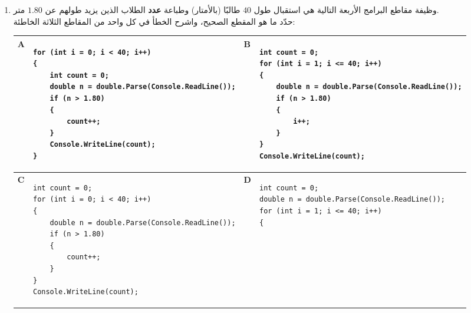 \documentclass[14pt]{extarticle}
\begin{document}
\begin{enumerate}[resume, itemsep=1em]

\item وظيفة مقاطع البرامج الأربعة التالية هي استقبال طول $40$ طالبًا (بالأمتار) وطباعة \textbf{عدد} الطلاب الذين يزيد طولهم عن $1.80$ متر. \\
حدّد ما هو المقطع الصحيح، واشرح الخطأ في كل واحد من المقاطع الثلاثة الخاطئة:

{\centering
\renewcommand{\arraystretch}{1.3}
\begin{tabular}{|C{0.8cm}|p{6.6cm}|C{0.8cm}|p{6.6cm}|}
\hline
$\mathbf{A}$ &
\begin{pycell}
\begin{english}
\begin{verbatim}
for (int i = 0; i < 40; i++)
{
    int count = 0;
    double n = double.Parse(Console.ReadLine());
    if (n > 1.80)
    {
        count++;
    }
    Console.WriteLine(count);
}
\end{verbatim}
\end{english}
\end{pycell}
& $\mathbf{B}$ &
\begin{pycell}
\begin{english}
\begin{verbatim}
int count = 0;
for (int i = 1; i <= 40; i++)
{
    double n = double.Parse(Console.ReadLine());
    if (n > 1.80)
    {
        i++;
    }
}
Console.WriteLine(count);
\end{verbatim}
\end{english}
\end{pycell}
\\ \hline
$\mathbf{C}$ &
\begin{pycell}
\begin{english}
\begin{verbatim}
int count = 0;
for (int i = 0; i < 40; i++)
{
    double n = double.Parse(Console.ReadLine());
    if (n > 1.80)
    {
        count++;
    }
}
Console.WriteLine(count);
\end{verbatim}
\end{english}
\end{pycell}
& $\mathbf{D}$ &
\begin{pycell}
\begin{english}
\begin{verbatim}
int count = 0;
double n = double.Parse(Console.ReadLine());
for (int i = 1; i <= 40; i++)
{

\end{verbatim}
\end{english}
\end{pycell}
\end{tabular}}
\end{enumerate}
\end{document}
